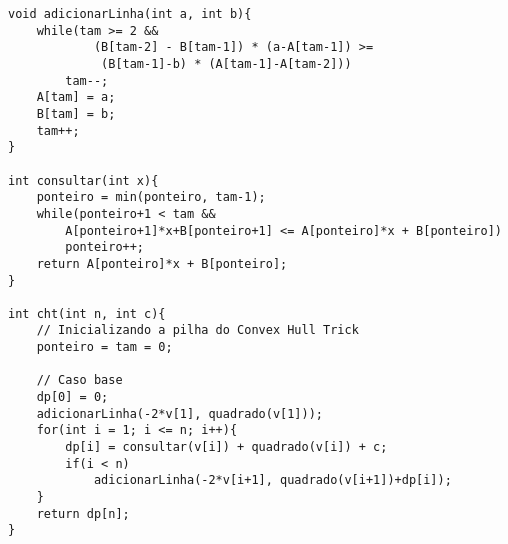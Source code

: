 \begin{itemize}[leftmargin=-.001in]
\begin{lstlisting}[caption={Implementação Convex Hull Trick 1},label={lst:cht}]
void adicionarLinha(int a, int b){
	while(tam >= 2 && 
			(B[tam-2] - B[tam-1]) * (a-A[tam-1]) >=
			 (B[tam-1]-b) * (A[tam-1]-A[tam-2]))
		tam--;
	A[tam] = a;
	B[tam] = b;
	tam++;
}

int consultar(int x){
	ponteiro = min(ponteiro, tam-1);
	while(ponteiro+1 < tam && 
		A[ponteiro+1]*x+B[ponteiro+1] <= A[ponteiro]*x + B[ponteiro])
		ponteiro++;
	return A[ponteiro]*x + B[ponteiro];
}

int cht(int n, int c){
	// Inicializando a pilha do Convex Hull Trick
	ponteiro = tam = 0;
	
	// Caso base
	dp[0] = 0;
	adicionarLinha(-2*v[1], quadrado(v[1]));
	for(int i = 1; i <= n; i++){
		dp[i] = consultar(v[i]) + quadrado(v[i]) + c;
		if(i < n)
			adicionarLinha(-2*v[i+1], quadrado(v[i+1])+dp[i]);
	}
	return dp[n];
}


\end{lstlisting}
\end{itemize}

